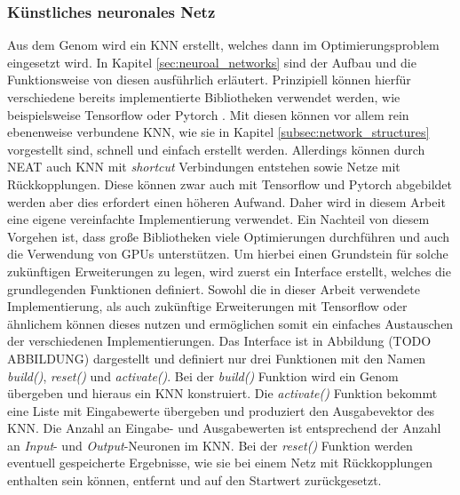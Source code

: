 \subsubsection{Künstliches neuronales Netz}
Aus dem Genom wird ein \ac{KNN} erstellt, welches dann im Optimierungsproblem eingesetzt wird. In Kapitel \ref{sec:neuroal_networks} sind der Aufbau und die Funktionsweise von diesen ausführlich erläutert. Prinzipiell können hierfür verschiedene bereits implementierte Bibliotheken verwendet werden, wie beispielsweise Tensorflow \cite{tensorflow2015} oder Pytorch \cite{pytorch2019}. Mit diesen können vor allem rein ebenenweise verbundene \ac{KNN}, wie sie in Kapitel \ref{subsec:network_structures} vorgestellt sind, schnell und einfach erstellt werden. Allerdings können durch \ac{NEAT} auch \ac{KNN} mit \emph{shortcut} Verbindungen entstehen sowie Netze mit Rückkopplungen. Diese können zwar auch mit Tensorflow und Pytorch abgebildet werden aber dies erfordert einen höheren Aufwand. Daher wird in diesem Arbeit eine eigene vereinfachte Implementierung verwendet. Ein Nachteil von diesem Vorgehen ist, dass große Bibliotheken viele Optimierungen durchführen und auch die Verwendung von \acp{GPU} unterstützen. Um hierbei einen Grundstein für solche zukünftigen Erweiterungen zu legen, wird zuerst ein Interface erstellt, welches die grundlegenden Funktionen definiert. Sowohl die in dieser Arbeit verwendete Implementierung, als auch zukünftige Erweiterungen mit Tensorflow oder ähnlichem können dieses nutzen und ermöglichen somit ein einfaches Austauschen der verschiedenen Implementierungen. Das Interface ist in Abbildung (TODO ABBILDUNG) dargestellt und definiert nur drei Funktionen mit den Namen \emph{build()}, \emph{reset()} und \emph{activate()}. Bei der \emph{build()} Funktion wird ein Genom übergeben und hieraus ein \ac{KNN} konstruiert. Die \emph{activate()} Funktion bekommt eine Liste mit Eingabewerte übergeben und produziert den Ausgabevektor des \ac{KNN}. Die Anzahl an Eingabe- und Ausgabewerten ist entsprechend der Anzahl an \emph{Input}- und \emph{Output}-Neuronen im \ac{KNN}. Bei der \emph{reset()} Funktion werden eventuell gespeicherte Ergebnisse, wie sie bei einem Netz mit Rückkopplungen enthalten sein können, entfernt und auf den Startwert zurückgesetzt. 
\\\\
